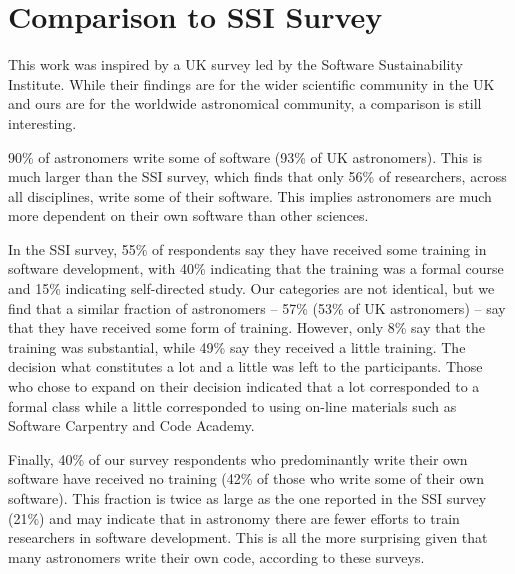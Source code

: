 \section{Comparison to SSI Survey}
\label{sec:ssicompare}

This work was inspired by a UK survey led by the Software Sustainability Institute. While their findings are for the wider scientific community in the UK and ours are for the worldwide astronomical community, a comparison is still interesting. 

90\% of astronomers write some of software (93\% of UK astronomers). This is much larger than the SSI survey, which finds that only 56\% of researchers, across all disciplines, write some of their software.  This implies astronomers are much more dependent on their own software than other sciences.

In the SSI survey, 55\% of respondents say they have received some training in software development, with 40\% indicating that the training was a formal course and 15\% indicating self-directed study. Our categories are not identical, but we find that a similar fraction of astronomers -- 57\% (53\% of UK astronomers) -- say that they have received some form of training. However, only 8\% say that the training was substantial, while 49\% say they received a little training. The decision what constitutes a lot and a little was left to the participants. Those who chose to expand on their decision indicated that a lot corresponded to a formal class while a little corresponded to using on-line materials such as Software Carpentry and Code Academy.

Finally, 40\% of our survey respondents who predominantly write their own software have received no training (42\% of those who write some of their own software). This fraction is twice as large as the one reported in the SSI survey (21\%) and may indicate that in astronomy there are fewer efforts to train researchers in software development.  This is all the more surprising given that many  astronomers write their own code, according to these surveys.



    
  